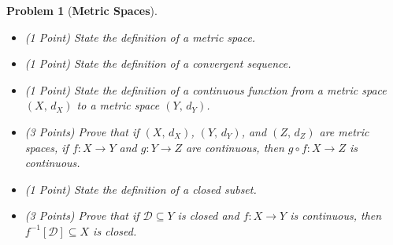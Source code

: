 \documentclass{article}
\theoremstyle{normal}
\newtheorem{problem}{Problem}
\begin{document}
    \clearpage
    \begin{problem}[\textbf{Metric Spaces}]
        \par\hfill\par\vspace{1em}
        \begin{itemize}
            \item (1 Point) State the definition of a metric space.
            \item (1 Point) State the definition of a convergent sequence.
            \item (1 Point) State the definition of a continuous function
                from a metric space $(X,\,d_{X})$ to a
                metric space $(Y,\,d_{Y})$.
            \item (3 Points) Prove that if $(X,\,d_{X})$, $(Y,\,d_{Y})$, and
                $(Z,\,d_{Z})$ are metric spaces, if $f:X\rightarrow{Y}$ and
                $g:Y\rightarrow{Z}$ are continuous, then
                $g\circ{f}:X\rightarrow{Z}$ is continuous.
            \item (1 Point) State the definition of a closed subset.
            \item (3 Points) Prove that if $\mathcal{D}\subseteq{Y}$ is closed
                and $f:X\rightarrow{Y}$ is continuous, then
                $f^{-1}[\mathcal{D}]\subseteq{X}$ is closed.
        \end{itemize}
    \end{problem}
    \clearpage
\end{document}
